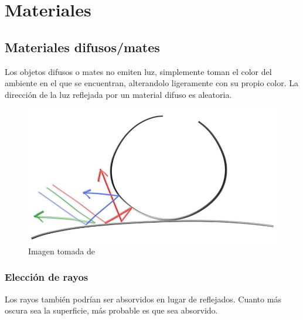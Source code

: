 \documentclass[12pt]{article}
\theoremstyle{definition}
\theoremstyle{remark}
\begin{document}
\section{Materiales}

\subsection{Materiales difusos/mates}

Los objetos difusos o mates no emiten luz, simplemente toman el color del ambiente en el que se encuentran, alterandolo ligeramente con su propio color. La dirección de la luz reflejada por un material difuso es aleatoria.

\begin{figure}[H]
   \center
  \includegraphics[scale=0.3]{diffuse.jpg}
  \caption{Imagen tomada de \cite{first_book}}
\end{figure}

\subsubsection{Elección de rayos}

Los rayos también podrían ser absorvidos en lugar de reflejados. Cuanto más oscura sea la superficie, más probable es que sea absorvido.
\end{document}
